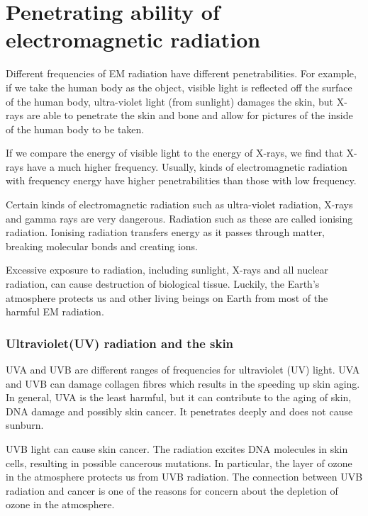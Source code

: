            \section{Penetrating ability of electromagnetic radiation}
            \nopagebreak
      \label{m38779*id189450}Different frequencies of EM radiation have different penetrabilities. For example, if we take the human body as the object, visible light is reflected off the surface of the human body, ultra-violet light (from sunlight) damages the skin, but X-rays are able to penetrate the skin and bone and allow for pictures of the inside of the human body to be taken.\par 
      \label{m38779*id189457}If we compare the energy of visible light to the energy of X-rays, we find that X-rays have a much higher frequency. Usually, kinds of electromagnetic radiation with frequency energy have higher penetrabilities than those with low frequency.\par 
      \label{m38779*id189462}Certain kinds of electromagnetic radiation such as ultra-violet radiation, X-rays and gamma rays are very dangerous. Radiation such as these are called ionising radiation. Ionising radiation transfers energy as it passes through matter, breaking molecular bonds and creating ions.\par 
      \label{m38779*id189468}Excessive exposure to radiation, including sunlight, X-rays and all nuclear radiation, can cause destruction of biological tissue. Luckily, the Earth's atmosphere protects us and other living beings on Earth from most of the harmful EM radiation.\par 
      \label{m38779*uid17}
            \subsubsection*{Ultraviolet(UV) radiation and the skin}
            \nopagebreak
        \label{m38779*id189482}UVA and UVB are different ranges of frequencies for ultraviolet (UV) light. UVA and UVB can damage collagen fibres which results in the speeding up skin aging. In general, UVA is the least harmful, but it can contribute to the aging of skin, DNA damage and possibly skin cancer. It penetrates deeply and does not cause sunburn. \par 
        \label{m38779*id189490}UVB light can cause skin cancer. The radiation excites DNA molecules in skin cells, resulting in possible cancerous mutations. In particular, the layer of ozone in the atmosphere protects us from UVB radiation. The connection between UVB radiation and cancer is one of the reasons for concern about the depletion of ozone in the atmosphere.\par 
        
